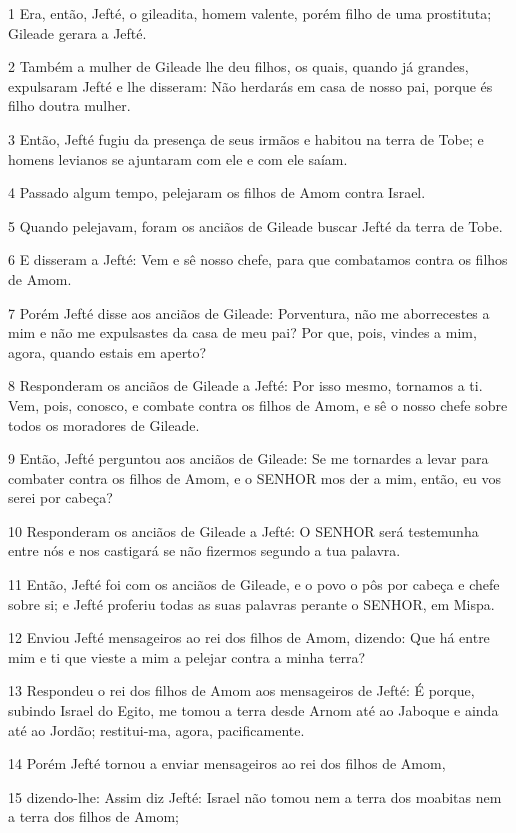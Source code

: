\par 1 Era, então, Jefté, o gileadita, homem valente, porém filho de uma prostituta; Gileade gerara a Jefté.
\par 2 Também a mulher de Gileade lhe deu filhos, os quais, quando já grandes, expulsaram Jefté e lhe disseram: Não herdarás em casa de nosso pai, porque és filho doutra mulher.
\par 3 Então, Jefté fugiu da presença de seus irmãos e habitou na terra de Tobe; e homens levianos se ajuntaram com ele e com ele saíam.
\par 4 Passado algum tempo, pelejaram os filhos de Amom contra Israel.
\par 5 Quando pelejavam, foram os anciãos de Gileade buscar Jefté da terra de Tobe.
\par 6 E disseram a Jefté: Vem e sê nosso chefe, para que combatamos contra os filhos de Amom.
\par 7 Porém Jefté disse aos anciãos de Gileade: Porventura, não me aborrecestes a mim e não me expulsastes da casa de meu pai? Por que, pois, vindes a mim, agora, quando estais em aperto?
\par 8 Responderam os anciãos de Gileade a Jefté: Por isso mesmo, tornamos a ti. Vem, pois, conosco, e combate contra os filhos de Amom, e sê o nosso chefe sobre todos os moradores de Gileade.
\par 9 Então, Jefté perguntou aos anciãos de Gileade: Se me tornardes a levar para combater contra os filhos de Amom, e o SENHOR mos der a mim, então, eu vos serei por cabeça?
\par 10 Responderam os anciãos de Gileade a Jefté: O SENHOR será testemunha entre nós e nos castigará se não fizermos segundo a tua palavra.
\par 11 Então, Jefté foi com os anciãos de Gileade, e o povo o pôs por cabeça e chefe sobre si; e Jefté proferiu todas as suas palavras perante o SENHOR, em Mispa.
\par 12 Enviou Jefté mensageiros ao rei dos filhos de Amom, dizendo: Que há entre mim e ti que vieste a mim a pelejar contra a minha terra?
\par 13 Respondeu o rei dos filhos de Amom aos mensageiros de Jefté: É porque, subindo Israel do Egito, me tomou a terra desde Arnom até ao Jaboque e ainda até ao Jordão; restitui-ma, agora, pacificamente.
\par 14 Porém Jefté tornou a enviar mensageiros ao rei dos filhos de Amom,
\par 15 dizendo-lhe: Assim diz Jefté: Israel não tomou nem a terra dos moabitas nem a terra dos filhos de Amom;
